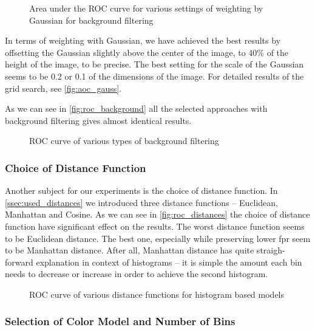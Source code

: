 \begin{figure}
    \centering
    \def\svgwidth{\columnwidth}
    \Large
    \scalebox{0.6}{}
    \caption{Area under the ROC curve for various settings of weighting by Gaussian for background filtering}
    \label{fig:aoc_gauss}
\end{figure}

In terms of weighting with Gaussian, we have achieved the best results
by offsetting the Gaussian slightly above the center of the image, to 40\%
of the height of the image, to be precise. The best setting for the scale
of the Gaussian seems to be 0.2 or 0.1 of the dimensions of the image. For detailed results
of the grid search, see \autoref{fig:aoc_gauss}.

As we can see in \autoref{fig:roc_background} all the selected approaches
with background filtering gives almost identical results.

\begin{figure}
    \centering
    \def\svgwidth{\columnwidth}
    
    \caption{ROC curve of various types of background filtering}
    \label{fig:roc_background}
\end{figure}

\subsubsection{Choice of Distance Function}

Another subject for our experiments is the choice of distance function. In
\autoref{ssec:used_distances} we introduced three distance functions --
Euclidean, Manhattan and Cosine. As we can see in \autoref{fig:roc_distances}
the choice of distance function have significant effect on the results.
The worst distance function seems to be Euclidean distance. The best one,
especially while preserving lower \gls{fpr} seem to be Manhattan distance.
After all, Manhattan distance has quite straigh-forward explanation in context
of histograms -- it is simple the amount each bin needs to decrease or increase
in order to achieve the second histogram.

\begin{figure}
    \centering
    \def\svgwidth{\columnwidth}
    
    \caption{ROC curve of various distance functions for histogram based models}
    \label{fig:roc_distances}
\end{figure}

\subsubsection{Selection of Color Model and Number of Bins}

